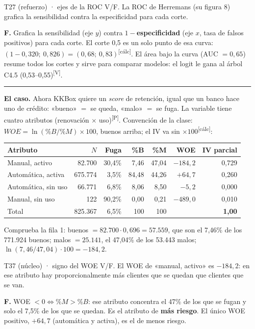 \documentclass[10pt,a4paper]{article}
\newcommand{\V}{\textsuperscript{\textcolor{green!45!black}{[V]}}}
\newcommand{\Pre}{\textsuperscript{\textcolor{orange!80!black}{[P]}}}
\newcommand{\calc}{\textsuperscript{\textcolor{blue!60!black}{[cálc]}}}
\newcommand{\acto}[1]{\vspace{6pt}{\large\bfseries #1}\par\vspace{2pt}\hrule\vspace{4pt}}
\begin{document}
\begin{enun}{T27 (refuerzo) · ejes de la ROC}
V/F. La ROC de Herremans (su figura 8) grafica la sensibilidad contra la especificidad para cada corte.
\end{enun}
\begin{ejemplar}
\textbf{F.} Grafica la sensibilidad (eje $y$) contra \textbf{$1-$especificidad} (eje $x$, tasa de falsos positivos) para cada corte. El corte 0,5 es un solo punto de esa curva: $(1-0{,}320;\ 0{,}826)=(0{,}68;\ 0{,}83)$\calc. El área bajo la curva (AUC $=0{,}65$) resume todos los cortes y sirve para comparar modelos: el logit le gana al árbol C4.5 (0,53--0,55)\V.
\end{ejemplar}

\acto{Acto 3. La scorecard de fuga: WOE e IV con los datos de KKBox}

\textbf{El caso.} Ahora KKBox quiere un \emph{score} de retención, igual que un banco hace uno de crédito: «bueno» $=$ se queda, «malo» $=$ se fuga. La variable tiene cuatro atributos (renovación × uso)\Pre. Convención de la clase: $WOE=\ln(\%B/\%M)\times100$, buenos arriba; el IV va sin $\times100$\calc:
\begin{center}\small
\renewcommand{\arraystretch}{1.15}
\begin{tabular}{lrrrrrr}\toprule
Atributo & $N$ & Fuga & \%B & \%M & WOE & IV parcial\\\midrule
Manual, activo & 82.700 & 30,4\% & 7,46 & 47,04 & $-184{,}2$ & 0,729\\
Automática, activa & 675.774 & 3,5\% & 84,48 & 44,26 & $+64{,}7$ & 0,260\\
Automática, sin uso & 66.771 & 6,8\% & 8,06 & 8,50 & $-5{,}2$ & 0,000\\
Manual, sin uso & 122 & 90,2\% & 0,00 & 0,21 & $-489{,}0$ & 0,010\\\midrule
Total & 825.367 & 6,5\% & 100 & 100 & & \textbf{1,00}\\\bottomrule
\end{tabular}
\end{center}
Comprueba la fila 1: buenos $=82.700\cdot0{,}696=57.559$, que son el 7,46\% de los 771.924 buenos; malos $=25.141$, el 47,04\% de los 53.443 malos; $\ln(7{,}46/47{,}04)\cdot100=-184{,}2$.

\begin{enun}{T37 (núcleo) · signo del WOE}
V/F. El WOE de «manual, activo» es $-184{,}2$: en ese atributo hay proporcionalmente más clientes que se quedan que clientes que se van.
\end{enun}
\begin{ejemplar}
\textbf{F.} WOE $<0\iff\%M>\%B$: ese atributo concentra el 47\% de los que se fugan y solo el 7,5\% de los que se quedan. Es el atributo de \textbf{más riesgo}. El único WOE positivo, $+64{,}7$ (automática y activa), es el de menos riesgo.
\end{ejemplar}
\end{document}
